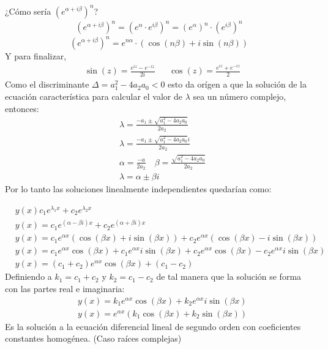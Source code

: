 ¿Cómo sería $\left(e^{\alpha+i\beta}\right)^n$?
\begin{align*}
    \left(e^{\alpha+i\beta}\right)^n = \left(e^{\alpha}\cdot e^{i\beta}\right)^n =\left(e^{\alpha}\right)^n\cdot\left(e^{i\beta}\right)^n
\end{align*}
\begin{equation}
    \left(e^{\alpha + i\beta}\right)^n = e^{n\alpha}\cdot\left(\cos{(n\beta)} + i\sin{(n\beta)}  \right)
\end{equation}
Y para finalizar, 
\begin{align*}
    &\sin{(z)} = \frac{e^{iz} - e^{ - iz}}{2i} && \cos{(z)} = \frac{e^{iz} + e^{ -iz}}{2} 
\end{align*}
Como el discriminante $\Delta = a_1^2-4a_2a_0< 0$ esto da orígen a que la solución de la ecuación característica para calcular el valor de $\lambda$ sea un número complejo, entonces:
\begin{align*}
    &\lambda = \frac{ -a_1 \pm \sqrt{a_1^2 -4a_2 a_0}}{2a_2}\\
    &\lambda = \frac{ -a_1 \pm \sqrt{a_1^2 -4a_2 a_0}i}{2a_2}\\
    &\alpha =\frac{ -a}{2a_2}\quad \beta = \frac{\sqrt{a_1^2 -4a_2a_0}}{2a_2}\\
    &\lambda = \alpha \pm \beta i
\end{align*}
Por lo tanto las soluciones linealmente independientes quedarían como:

\begin{align*}
    &y(x) c_1 e^{\lambda_1x} + c_2 e^{\lambda_2x}\\
    &y(x) =c_1e^{\left(\alpha - \beta i\right) x} + c_2e^{\left(\alpha + \beta i\right) x}\\
    &y(x) = c_1e^{\alpha x}\left(\cos{(\beta x)} + i \sin{(\beta x)}  \right) + c_2e^{\alpha x}\left(\cos{(\beta x)} - i \sin{(\beta x)}  \right)\\
    &y(x) = c_1e^{\alpha x}\cos{(\beta x)} + c_1e^{\alpha x}i\sin{(\beta x)} + c_2e^{\alpha x}\cos{(\beta x)} - c_2e^{\alpha x}i\sin{(\beta x)}\\
    &y(x) = \left(c_1 + c_2\right)e^{\alpha x}\cos{(\beta x)} + \left(c_1 - c_2\right)  
\end{align*}
Definiendo a $k_1= c_1+c_2$ y $k_2=c_1-c_2$ de tal manera que la solución se forma con las partes real e imaginaria:
\begin{align*}
    &y(x) =k_1e^{\alpha x}\cos{(\beta x)} + k_2e^{\alpha x}i\sin{(\beta x)}\\
    &y(x) = e^{\alpha x}\left(k_1\cos{(\beta x)} + k_2 \sin{(\beta x)}  \right)
\end{align*}
Es la solución a la ecuación diferencial lineal de segundo orden con coeficientes constantes homogénea. (Caso raíces complejas)

